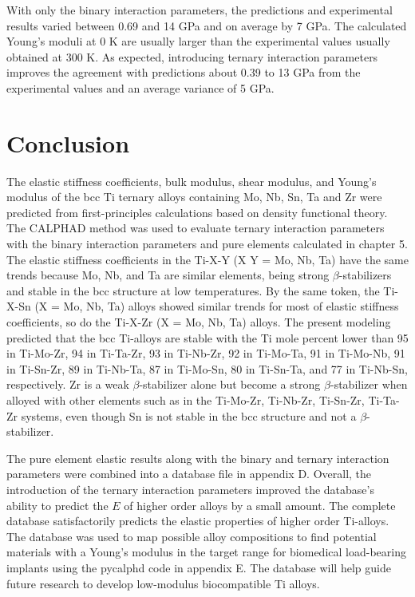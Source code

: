 With only the binary interaction parameters, the predictions and experimental results varied between 0.69 and 14 GPa and on average by 7 GPa. The calculated Young's moduli at 0 K are usually larger than the experimental values usually obtained at 300 K. As expected, introducing ternary interaction parameters improves the agreement with predictions about 0.39 to 13 GPa from the experimental values and an average variance of 5 GPa.

\section{Conclusion}

The elastic stiffness coefficients, bulk modulus, shear modulus, and Young’s modulus of the bcc Ti ternary alloys containing Mo, Nb, Sn, Ta and Zr were predicted from first-principles calculations based on density functional theory. The CALPHAD method was used to evaluate ternary interaction parameters with the binary interaction parameters and pure elements calculated in chapter 5. The elastic stiffness coefficients in the Ti-X-Y (X  Y = Mo, Nb, Ta) have the same trends because Mo, Nb, and Ta are similar elements, being strong $\beta$-stabilizers and stable in the bcc structure at low temperatures. By the same token, the Ti-X-Sn (X = Mo, Nb, Ta) alloys showed similar trends for most of elastic stiffness coefficients, so do the Ti-X-Zr (X = Mo, Nb, Ta) alloys. The present modeling predicted that the bcc Ti-alloys are stable with the Ti mole percent lower than 95 in Ti-Mo-Zr, 94 in Ti-Ta-Zr, 93 in Ti-Nb-Zr, 92 in Ti-Mo-Ta, 91 in Ti-Mo-Nb, 91 in Ti-Sn-Zr, 89 in Ti-Nb-Ta, 87 in Ti-Mo-Sn, 80 in Ti-Sn-Ta, and 77 in Ti-Nb-Sn, respectively. Zr is a weak $\beta$-stabilizer alone but become a strong $\beta$-stabilizer when alloyed with other elements such as in the Ti-Mo-Zr, Ti-Nb-Zr, Ti-Sn-Zr, Ti-Ta-Zr systems, even though Sn is not stable in the bcc structure and not a $\beta$-stabilizer.

The pure element elastic results along with the binary and ternary interaction parameters were combined into a database file in appendix D. Overall, the introduction of the ternary interaction parameters improved the database's ability to predict the $E$ of higher order alloys by a small amount. The complete database satisfactorily predicts the elastic properties of higher order Ti-alloys. The database was used to map possible alloy compositions to find potential materials with a Young's modulus in the target range for biomedical load-bearing implants using the pycalphd code in appendix E.  The database will help guide future research to develop low-modulus biocompatible Ti alloys.

